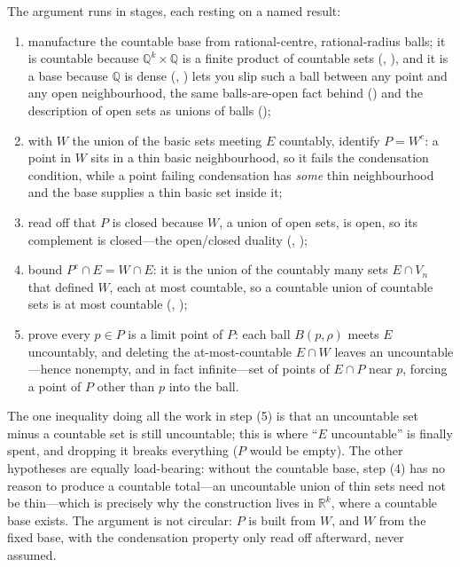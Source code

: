 \documentclass[main.tex]{subfiles}
\begin{document}
\begin{Reflection}
The argument runs in stages, each resting on a named result:
\begin{enumerate}[leftmargin=1.7em,itemsep=3pt,topsep=2pt,label=\textnormal{(\arabic*)}]
  \item manufacture the countable base from rational-centre, rational-radius balls; it is countable
        because $\mathbb Q^{k}\times\mathbb Q$ is a finite product of countable sets
        (, ), and it is a base because $\mathbb Q$ is dense
        (, ) lets you slip such a ball
        between any point and any open neighbourhood, the same balls-are-open fact behind
         () and the description of open sets as
        unions of balls ();
  \item with $W$ the union of the basic sets meeting $E$ countably, identify $P=W^{c}$: a point in $W$
        sits in a thin basic neighbourhood, so it fails the condensation condition, while a point failing
        condensation has \emph{some} thin neighbourhood and the base supplies a thin basic set inside it;
  \item read off that $P$ is closed because $W$, a union of open sets, is open, so its complement is
        closed---the open/closed duality 
        (, );
  \item bound $P^{c}\cap E=W\cap E$: it is the union of the countably many sets $E\cap V_n$ that defined
        $W$, each at most countable, so a countable union of countable sets is at most countable
        (, );
  \item prove every $p\in P$ is a limit point of $P$: each ball $B(p,\rho)$ meets $E$ uncountably, and
        deleting the at-most-countable $E\cap W$ leaves an uncountable---hence nonempty, and in fact
        infinite---set of points of $E\cap P$ near $p$, forcing a point of $P$ other than $p$ into the
        ball.
\end{enumerate}

The one inequality doing all the work in step (5) is that an uncountable set minus a countable set is
still uncountable; this is where ``$E$ uncountable'' is finally spent, and dropping it breaks everything
($P$ would be empty). The other hypotheses are equally load-bearing: without the countable base, step (4)
has no reason to produce a countable total---an uncountable union of thin sets need not be thin---which is
precisely why the construction lives in $\mathbb R^{k}$, where a countable base exists. The argument is
not circular: $P$ is built from $W$, and $W$ from the fixed base, with the condensation property only
read off afterward, never assumed.


\end{Reflection}
\end{document}
